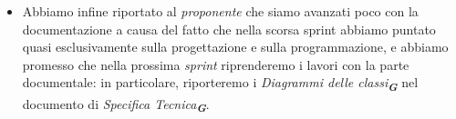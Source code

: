 \begin{itemize}
    \item Abbiamo infine riportato al \emph{proponente} che siamo avanzati poco con la documentazione a causa del fatto che nella scorsa sprint abbiamo puntato quasi esclusivamente sulla progettazione e sulla programmazione, e abbiamo promesso che nella prossima \emph{sprint} riprenderemo i lavori con la parte documentale: in particolare, riporteremo i \emph{Diagrammi delle classi}\textsubscript{\textbf{\textit{G}}} nel documento di \emph{Specifica Tecnica}\textsubscript{\textbf{\textit{G}}}.

\end{itemize}